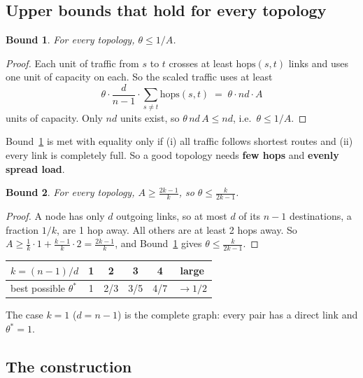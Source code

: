 \documentclass[11pt]{article}
\newtheorem{bound}{Bound}
\theoremstyle{definition}
\begin{document}
\subsection{Upper bounds that hold for every topology}

\begin{bound}\label{b:1}
For every topology, $\theta \le 1/A$.
\end{bound}
\begin{proof}
Each unit of traffic from $s$ to $t$ crosses at least $\mathrm{hops}(s,t)$ links and uses one unit of capacity on
each. So the scaled traffic uses at least
\[
\theta\cdot\frac{d}{n-1}\cdot\sum_{s\ne t}\mathrm{hops}(s,t) \;=\; \theta \cdot nd \cdot A
\]
units of capacity. Only $nd$ units exist, so $\theta\, nd\, A \le nd$, i.e.\ $\theta \le 1/A$.
\end{proof}

\noindent Bound~\ref{b:1} is met with equality only if (i) all traffic follows shortest routes and (ii) every link is
completely full. So a good topology needs \textbf{few hops} and \textbf{evenly spread load}.

\begin{bound}\label{b:2}
For every topology, $A \ge \frac{2k-1}{k}$, so $\theta \le \frac{k}{2k-1}$.
\end{bound}
\begin{proof}
A node has only $d$ outgoing links, so at most $d$ of its $n-1$ destinations, a fraction $1/k$, are 1 hop away. All
others are at least 2 hops away. So $A \ge \frac{1}{k}\cdot 1 + \frac{k-1}{k}\cdot 2 = \frac{2k-1}{k}$, and
Bound~\ref{b:1} gives $\theta \le \frac{k}{2k-1}$.
\end{proof}

\begin{table}[H]
\centering
\begin{tabular}{l ccccc}
\toprule
$k = (n-1)/d$ & 1 & 2 & 3 & 4 & large \\
\midrule
best possible $\theta^*$ & 1 & 2/3 & 3/5 & 4/7 & $\to 1/2$ \\
\bottomrule
\end{tabular}
\end{table}
\noindent The case $k=1$ ($d = n-1$) is the complete graph: every pair has a direct link and $\theta^*=1$.

\subsection{The construction}
\end{document}
